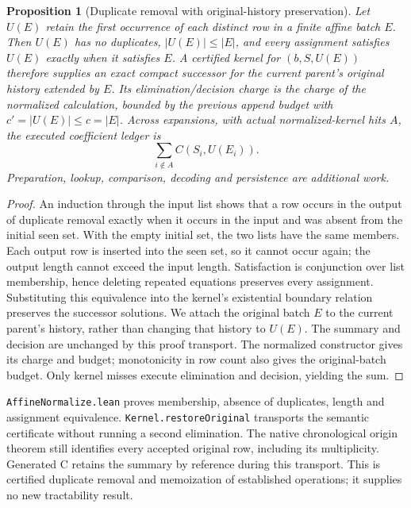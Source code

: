 \documentclass[11pt,a4paper]{article}
\numberwithin{equation}{section}
\theoremstyle{plain}
\newtheorem{proposition}[lemma]{Proposition}
\theoremstyle{definition}
\theoremstyle{remark}
\begin{document}
\begin{proposition}[Duplicate removal with original-history preservation]
\label{prop:affine-normalization}
Let $U(E)$ retain the first occurrence of each distinct row in a finite affine batch $E$. Then $U(E)$ has no duplicates, $|U(E)|\leq |E|$, and every assignment satisfies $U(E)$ exactly when it satisfies $E$. A certified kernel for $(b,S,U(E))$ therefore supplies an exact compact successor for the current parent's original history extended by $E$. Its elimination/decision charge is the charge of the normalized calculation, bounded by the previous append budget with $c'=|U(E)|\leq c=|E|$. Across expansions, with actual normalized-kernel hits $A$, the executed coefficient ledger is
\[
\sum_{i\notin A} C(S_i,U(E_i)).
\]
Preparation, lookup, comparison, decoding and persistence are additional work.
\end{proposition}
\begin{proof}
An induction through the input list shows that a row occurs in the output of duplicate removal exactly when it occurs in the input and was absent from the initial seen set. With the empty initial set, the two lists have the same members. Each output row is inserted into the seen set, so it cannot occur again; the output length cannot exceed the input length. Satisfaction is conjunction over list membership, hence deleting repeated equations preserves every assignment. Substituting this equivalence into the kernel's existential boundary relation preserves the successor solutions. We attach the original batch $E$ to the current parent's history, rather than changing that history to $U(E)$. The summary and decision are unchanged by this proof transport. The normalized constructor gives its charge and budget; monotonicity in row count also gives the original-batch budget. Only kernel misses execute elimination and decision, yielding the sum.
\end{proof}

\texttt{AffineNormalize.lean} proves membership, absence of duplicates, length and assignment equivalence. \texttt{Kernel.restoreOriginal} transports the semantic certificate without running a second elimination. The native chronological origin theorem still identifies every accepted original row, including its multiplicity. Generated C retains the summary by reference during this transport. This is certified duplicate removal and memoization of established operations; it supplies no new tractability result.
\end{document}
